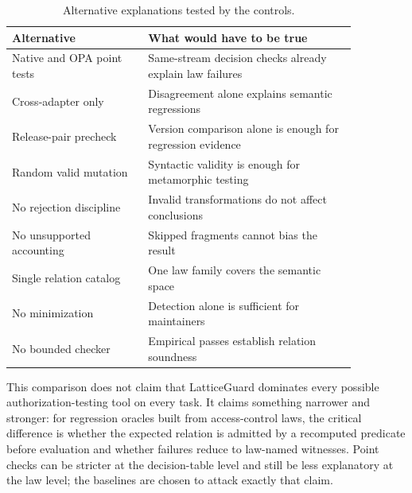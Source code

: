 \documentclass[10pt,conference]{IEEEtran}
\begin{document}
\begin{table}[t]
\centering
\caption{Alternative explanations tested by the controls.}
\label{tab:baselines}
\begin{tabular}{p{0.34\linewidth}p{0.52\linewidth}}
\toprule
Alternative & What would have to be true \\
\midrule
Native and OPA point tests & Same-stream decision checks already explain law failures \\
Cross-adapter only & Disagreement alone explains semantic regressions \\
Release-pair precheck & Version comparison alone is enough for regression evidence \\
Random valid mutation & Syntactic validity is enough for metamorphic testing \\
No rejection discipline & Invalid transformations do not affect conclusions \\
No unsupported accounting & Skipped fragments cannot bias the result \\
Single relation catalog & One law family covers the semantic space \\
No minimization & Detection alone is sufficient for maintainers \\
No bounded checker & Empirical passes establish relation soundness \\
\bottomrule
\end{tabular}
\end{table}

This comparison does not claim that LatticeGuard dominates every possible authorization-testing tool on every task.  It claims something narrower and stronger: for regression oracles built from access-control laws, the critical difference is whether the expected relation is admitted by a recomputed predicate before evaluation and whether failures reduce to law-named witnesses.  Point checks can be stricter at the decision-table level and still be less explanatory at the law level; the baselines are chosen to attack exactly that claim.
\end{document}
